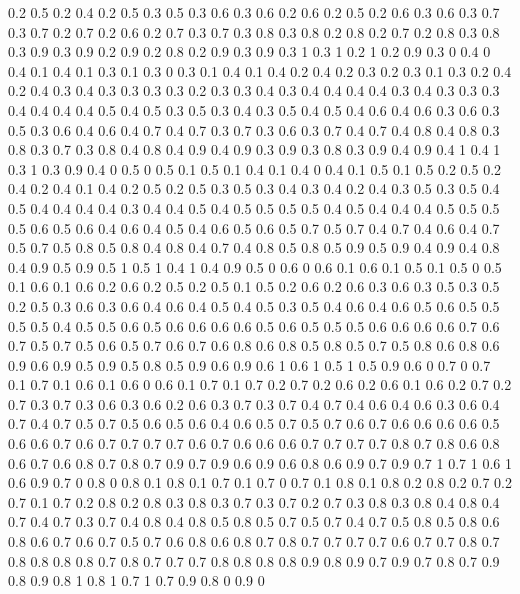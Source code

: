 0.2 0.5
0.2 0.4
0.2 0.5
0.3 0.5
0.3 0.6
0.3 0.6
0.2 0.6
0.2 0.5
0.2 0.6
0.3 0.6
0.3 0.7
0.3 0.7
0.2 0.7
0.2 0.6
0.2 0.7
0.3 0.7
0.3 0.8
0.3 0.8
0.2 0.8
0.2 0.7
0.2 0.8
0.3 0.8
0.3 0.9
0.3 0.9
0.2 0.9
0.2 0.8
0.2 0.9
0.3 0.9
0.3 1
0.3 1
0.2 1
0.2 0.9
0.3 0
0.4 0
0.4 0.1
0.4 0.1
0.3 0.1
0.3 0
0.3 0.1
0.4 0.1
0.4 0.2
0.4 0.2
0.3 0.2
0.3 0.1
0.3 0.2
0.4 0.2
0.4 0.3
0.4 0.3
0.3 0.3
0.3 0.2
0.3 0.3
0.4 0.3
0.4 0.4
0.4 0.4
0.3 0.4
0.3 0.3
0.3 0.4
0.4 0.4
0.4 0.5
0.4 0.5
0.3 0.5
0.3 0.4
0.3 0.5
0.4 0.5
0.4 0.6
0.4 0.6
0.3 0.6
0.3 0.5
0.3 0.6
0.4 0.6
0.4 0.7
0.4 0.7
0.3 0.7
0.3 0.6
0.3 0.7
0.4 0.7
0.4 0.8
0.4 0.8
0.3 0.8
0.3 0.7
0.3 0.8
0.4 0.8
0.4 0.9
0.4 0.9
0.3 0.9
0.3 0.8
0.3 0.9
0.4 0.9
0.4 1
0.4 1
0.3 1
0.3 0.9
0.4 0
0.5 0
0.5 0.1
0.5 0.1
0.4 0.1
0.4 0
0.4 0.1
0.5 0.1
0.5 0.2
0.5 0.2
0.4 0.2
0.4 0.1
0.4 0.2
0.5 0.2
0.5 0.3
0.5 0.3
0.4 0.3
0.4 0.2
0.4 0.3
0.5 0.3
0.5 0.4
0.5 0.4
0.4 0.4
0.4 0.3
0.4 0.4
0.5 0.4
0.5 0.5
0.5 0.5
0.4 0.5
0.4 0.4
0.4 0.5
0.5 0.5
0.5 0.6
0.5 0.6
0.4 0.6
0.4 0.5
0.4 0.6
0.5 0.6
0.5 0.7
0.5 0.7
0.4 0.7
0.4 0.6
0.4 0.7
0.5 0.7
0.5 0.8
0.5 0.8
0.4 0.8
0.4 0.7
0.4 0.8
0.5 0.8
0.5 0.9
0.5 0.9
0.4 0.9
0.4 0.8
0.4 0.9
0.5 0.9
0.5 1
0.5 1
0.4 1
0.4 0.9
0.5 0
0.6 0
0.6 0.1
0.6 0.1
0.5 0.1
0.5 0
0.5 0.1
0.6 0.1
0.6 0.2
0.6 0.2
0.5 0.2
0.5 0.1
0.5 0.2
0.6 0.2
0.6 0.3
0.6 0.3
0.5 0.3
0.5 0.2
0.5 0.3
0.6 0.3
0.6 0.4
0.6 0.4
0.5 0.4
0.5 0.3
0.5 0.4
0.6 0.4
0.6 0.5
0.6 0.5
0.5 0.5
0.5 0.4
0.5 0.5
0.6 0.5
0.6 0.6
0.6 0.6
0.5 0.6
0.5 0.5
0.5 0.6
0.6 0.6
0.6 0.7
0.6 0.7
0.5 0.7
0.5 0.6
0.5 0.7
0.6 0.7
0.6 0.8
0.6 0.8
0.5 0.8
0.5 0.7
0.5 0.8
0.6 0.8
0.6 0.9
0.6 0.9
0.5 0.9
0.5 0.8
0.5 0.9
0.6 0.9
0.6 1
0.6 1
0.5 1
0.5 0.9
0.6 0
0.7 0
0.7 0.1
0.7 0.1
0.6 0.1
0.6 0
0.6 0.1
0.7 0.1
0.7 0.2
0.7 0.2
0.6 0.2
0.6 0.1
0.6 0.2
0.7 0.2
0.7 0.3
0.7 0.3
0.6 0.3
0.6 0.2
0.6 0.3
0.7 0.3
0.7 0.4
0.7 0.4
0.6 0.4
0.6 0.3
0.6 0.4
0.7 0.4
0.7 0.5
0.7 0.5
0.6 0.5
0.6 0.4
0.6 0.5
0.7 0.5
0.7 0.6
0.7 0.6
0.6 0.6
0.6 0.5
0.6 0.6
0.7 0.6
0.7 0.7
0.7 0.7
0.6 0.7
0.6 0.6
0.6 0.7
0.7 0.7
0.7 0.8
0.7 0.8
0.6 0.8
0.6 0.7
0.6 0.8
0.7 0.8
0.7 0.9
0.7 0.9
0.6 0.9
0.6 0.8
0.6 0.9
0.7 0.9
0.7 1
0.7 1
0.6 1
0.6 0.9
0.7 0
0.8 0
0.8 0.1
0.8 0.1
0.7 0.1
0.7 0
0.7 0.1
0.8 0.1
0.8 0.2
0.8 0.2
0.7 0.2
0.7 0.1
0.7 0.2
0.8 0.2
0.8 0.3
0.8 0.3
0.7 0.3
0.7 0.2
0.7 0.3
0.8 0.3
0.8 0.4
0.8 0.4
0.7 0.4
0.7 0.3
0.7 0.4
0.8 0.4
0.8 0.5
0.8 0.5
0.7 0.5
0.7 0.4
0.7 0.5
0.8 0.5
0.8 0.6
0.8 0.6
0.7 0.6
0.7 0.5
0.7 0.6
0.8 0.6
0.8 0.7
0.8 0.7
0.7 0.7
0.7 0.6
0.7 0.7
0.8 0.7
0.8 0.8
0.8 0.8
0.7 0.8
0.7 0.7
0.7 0.8
0.8 0.8
0.8 0.9
0.8 0.9
0.7 0.9
0.7 0.8
0.7 0.9
0.8 0.9
0.8 1
0.8 1
0.7 1
0.7 0.9
0.8 0
0.9 0

